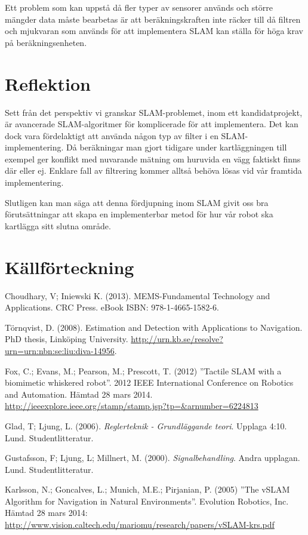 \documentclass[a4paper,12pt,fleqn]{article}
\begin{document}
Ett problem som kan uppstå då fler typer av sensorer används och större mängder data måste bearbetas är att beräkningskraften inte räcker till då filtren och mjukvaran som används för att implementera SLAM kan ställa för höga krav på beräkningsenheten. 

\section{Reflektion}

Sett från det perspektiv vi granskar SLAM-problemet, inom ett kandidatprojekt, är avancerade SLAM-algoritmer för komplicerade för att implementera. Det kan dock vara fördelaktigt att använda någon typ av filter i en SLAM-implementering. Då beräkningar man gjort tidigare under kartläggningen till exempel ger konflikt med nuvarande mätning om huruvida en vägg faktiskt finns där eller ej. Enklare fall av filtrering kommer alltså behöva lösas vid vår framtida implementering. 

Slutligen kan man säga att denna fördjupning inom SLAM givit oss bra förutsättningar att skapa en implementerbar metod för hur vår robot ska kartlägga sitt slutna område. 

\newpage 
\section*{Källförteckning} 

Choudhary, V; Iniewski K. (2013). MEMS-Fundamental Technology and Applications. CRC Press.
eBook ISBN: 978-1-4665-1582-6.

Törnqvist, D. (2008). Estimation and Detection with Applications to Navigation.  PhD thesis, Linköping University. \url{http://urn.kb.se/resolve?urn=urn:nbn:se:liu:diva-14956}. 

Fox, C.; Evans, M.; Pearson, M.; Prescott, T. (2012)
''Tactile SLAM with a biomimetic whiskered robot''. 2012 IEEE International Conference on Robotics and Automation. Hämtad 28 mars 2014.
\url{http://ieeexplore.ieee.org/stamp/stamp.jsp?tp=&arnumber=6224813}

Glad, T; Ljung, L. (2006). \textit{Reglerteknik - Grundläggande teori}. Upplaga 4:10. Lund. Studentlitteratur.

Gustafsson, F; Ljung, L; Millnert, M. (2000). \textit{Signalbehandling}. Andra upplagan. Lund. Studentlitteratur.

Karlsson, N.; Goncalves, L.; Munich, M.E.; Pirjanian, P. (2005)
''The vSLAM Algorithm for Navigation in Natural Environments''. Evolution Robotics, Inc. Hämtad 28 mars 2014:
\url{http://www.vision.caltech.edu/mariomu/research/papers/vSLAM-krs.pdf}
\end{document}
